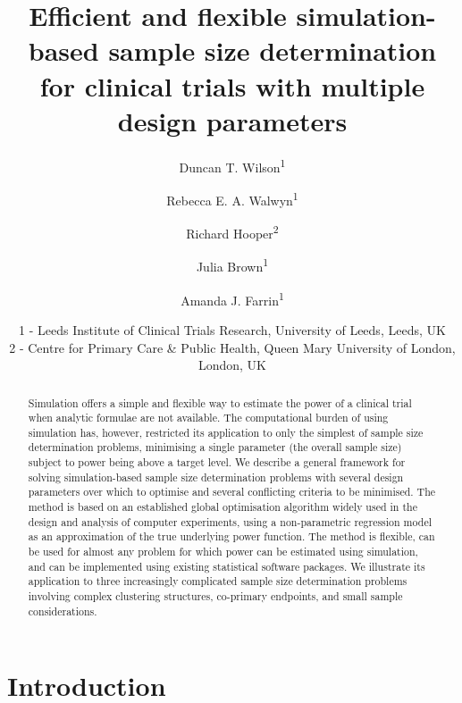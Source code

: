 \documentclass{article}
\begin{document}
\title{Efficient and flexible simulation-based sample size determination for clinical trials with multiple design parameters}

\author{Duncan T. Wilson\textsuperscript{1} \and
	Rebecca E. A. Walwyn\textsuperscript{1} \and
	Richard Hooper\textsuperscript{2} \and
	Julia Brown\textsuperscript{1} \and
	Amanda J. Farrin\textsuperscript{1} }
\date{1 - Leeds Institute of Clinical Trials Research, University of Leeds, Leeds, UK \\ 2 - Centre for Primary Care \& Public Health, Queen Mary University of London, London, UK}

\maketitle

\begin{abstract}
Simulation offers a simple and flexible way to estimate the power of a clinical trial when analytic formulae are not available. The computational burden of using simulation has, however, restricted its application to only the simplest of sample size determination problems, minimising a single parameter (the overall sample size) subject to power being above a target level. We describe a general framework for solving simulation-based sample size determination problems with several design parameters over which to optimise and several conflicting criteria to be minimised. The method is based on an established global optimisation algorithm widely used in the design and analysis of computer experiments, using a non-parametric regression model as an approximation of the true underlying power function. The method is flexible, can be used for almost any problem for which power can be estimated using simulation, and can be implemented using existing statistical software packages. We illustrate its application to three increasingly complicated sample size determination problems involving complex clustering structures, co-primary endpoints, and small sample considerations.
\end{abstract}

\section{Introduction}\label{sec:intro}
\end{document}

